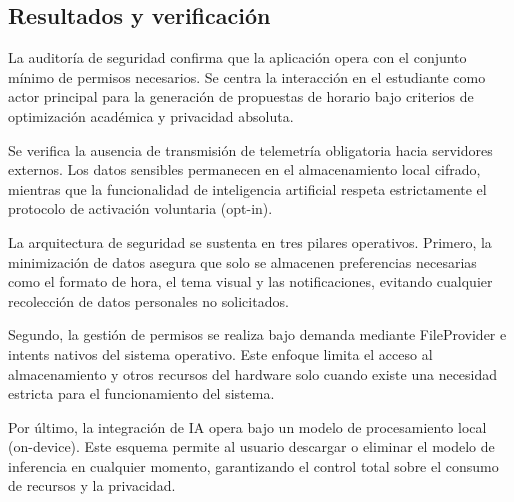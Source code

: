 \subsection{Resultados y verificación}
La auditoría de seguridad confirma que la aplicación opera con el conjunto mínimo de permisos necesarios. Se centra la interacción en el estudiante como actor principal para la generación de propuestas de horario bajo criterios de optimización académica y privacidad absoluta.

Se verifica la ausencia de transmisión de telemetría obligatoria hacia servidores externos. Los datos sensibles permanecen en el almacenamiento local cifrado, mientras que la funcionalidad de inteligencia artificial respeta estrictamente el protocolo de activación voluntaria (opt-in).

La arquitectura de seguridad se sustenta en tres pilares operativos. Primero, la minimización de datos asegura que solo se almacenen preferencias necesarias como el formato de hora, el tema visual y las notificaciones, evitando cualquier recolección de datos personales no solicitados.

Segundo, la gestión de permisos se realiza bajo demanda mediante FileProvider e intents nativos del sistema operativo. Este enfoque limita el acceso al almacenamiento y otros recursos del hardware solo cuando existe una necesidad estricta para el funcionamiento del sistema.

Por último, la integración de IA opera bajo un modelo de procesamiento local (on-device). Este esquema permite al usuario descargar o eliminar el modelo de inferencia en cualquier momento, garantizando el control total sobre el consumo de recursos y la privacidad.
